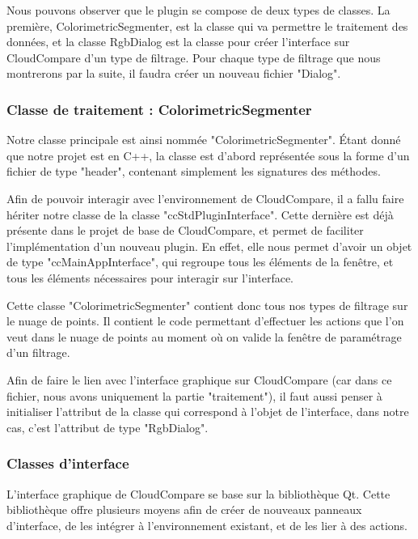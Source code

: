 \documentclass[12pt,titlepage,french]{article}
\begin{document}
Nous pouvons observer que le plugin se compose de deux types de classes. La première, ColorimetricSegmenter, est la classe qui va permettre le traitement des données, et la classe RgbDialog est la classe pour créer l'interface sur CloudCompare d'un type de filtrage. Pour chaque type de filtrage que nous montrerons par la suite, il faudra créer un nouveau fichier "Dialog".

\subsubsection{Classe de traitement : ColorimetricSegmenter}

Notre classe principale est ainsi nommée "ColorimetricSegmenter". Étant donné que notre projet est en C++, la classe est d'abord représentée sous la forme d'un fichier de type "header", contenant simplement les signatures des méthodes. \newline

Afin de pouvoir interagir avec l'environnement de CloudCompare, il a fallu faire hériter notre classe de la classe "ccStdPluginInterface". Cette dernière est déjà présente dans le projet de base de CloudCompare, et permet de faciliter l'implémentation d'un nouveau plugin. En effet, elle nous permet d'avoir un objet de type "ccMainAppInterface", qui regroupe tous les éléments de la fenêtre, et tous les éléments nécessaires pour interagir sur l'interface. \newline

Cette classe "ColorimetricSegmenter" contient donc tous nos types de filtrage sur le nuage de points. Il contient le code permettant d'effectuer les actions que l'on veut dans le nuage de points au moment où on valide la fenêtre de paramétrage d'un filtrage. \newline

Afin de faire le lien avec l'interface graphique sur CloudCompare (car dans ce fichier, nous avons uniquement la partie "traitement"), il faut aussi penser à initialiser l'attribut de la classe qui correspond à l'objet de l'interface, dans notre cas, c'est l'attribut de type "RgbDialog".

\subsubsection{Classes d'interface}

L'interface graphique de CloudCompare se base sur la bibliothèque Qt. Cette bibliothèque offre plusieurs moyens afin de créer de nouveaux panneaux d'interface, de les intégrer à l'environnement existant, et de les lier à des actions. \newline
\end{document}
